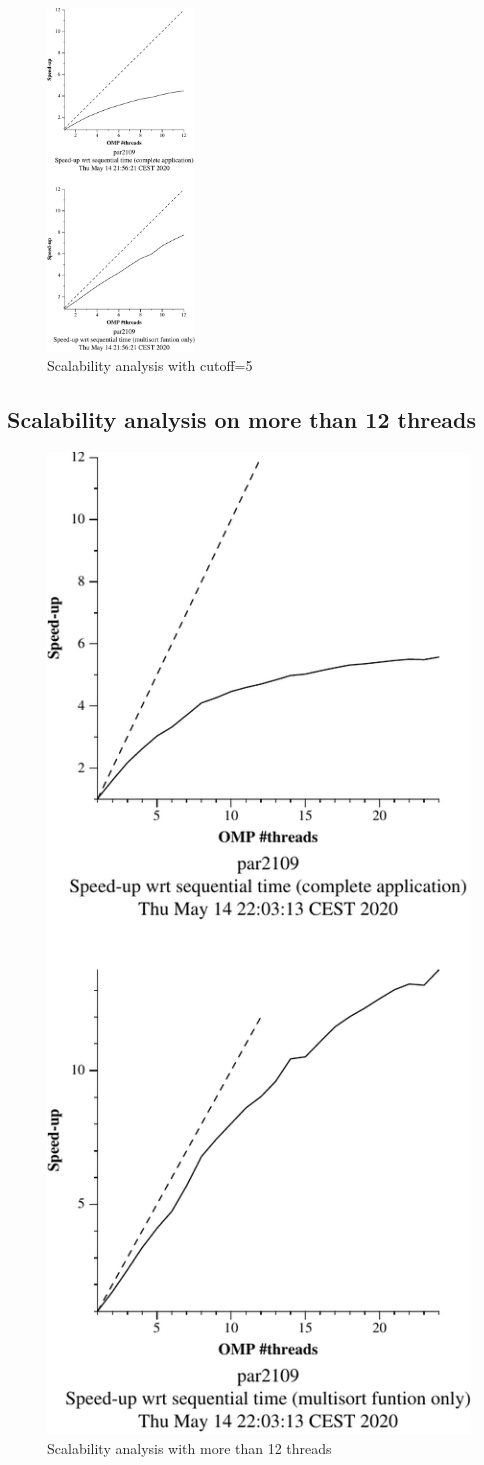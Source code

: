 \begin{figure}[H]
        \centering
        \includegraphics[width=0.35\textwidth]{plots/new-omp-tree-cutoff-5-crop.pdf}
        \caption{Scalability analysis with cutoff=5}
        \label{fig:cutoff5} 
\end{figure}

\pagebreak
\subsection{Scalability analysis on more than 12 threads}

\begin{figure}[H]
        \centering
        \includegraphics[width=0.35\linewidth]{plots/new-omp-tree-cutoff-24-crop.pdf}
        \caption{Scalability analysis with more than 12 threads}
        \label{fig:ssa_cutoff24} 
\end{figure}

